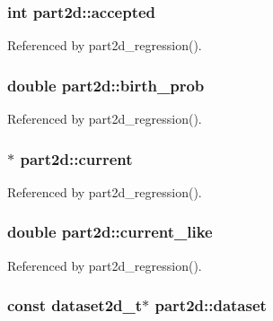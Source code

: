 \subsubsection[{\texorpdfstring{accepted}{accepted}}]{\setlength{\rightskip}{0pt plus 5cm}int part2d\+::accepted}\hypertarget{structpart2d_a06814a7ff2b812578c137f2a91b514ed}{}\label{structpart2d_a06814a7ff2b812578c137f2a91b514ed}


Referenced by part2d\+\_\+regression().

\subsubsection[{\texorpdfstring{birth\+\_\+prob}{birth_prob}}]{\setlength{\rightskip}{0pt plus 5cm}double part2d\+::birth\+\_\+prob}\hypertarget{structpart2d_af8cda1814348b3dc3c0b4b9b66e42617}{}\label{structpart2d_af8cda1814348b3dc3c0b4b9b66e42617}


Referenced by part2d\+\_\+regression().

\subsubsection[{\texorpdfstring{current}{current}}]{$\ast$ part2d\+::current}\hypertarget{structpart2d_a54d459969d63631513d399f101dba2f3}{}\label{structpart2d_a54d459969d63631513d399f101dba2f3}


Referenced by part2d\+\_\+regression().

\subsubsection[{\texorpdfstring{current\+\_\+like}{current_like}}]{\setlength{\rightskip}{0pt plus 5cm}double part2d\+::current\+\_\+like}\hypertarget{structpart2d_ad0a254abb0f7fd5f55f7955b71e32111}{}\label{structpart2d_ad0a254abb0f7fd5f55f7955b71e32111}


Referenced by part2d\+\_\+regression().

\subsubsection[{\texorpdfstring{dataset}{dataset}}]{\setlength{\rightskip}{0pt plus 5cm}const {\bf dataset2d\+\_\+t}$\ast$ part2d\+::dataset}\hypertarget{structpart2d_adba12a9311837fd7fdaac9e31e30be09}{}\label{structpart2d_adba12a9311837fd7fdaac9e31e30be09}


